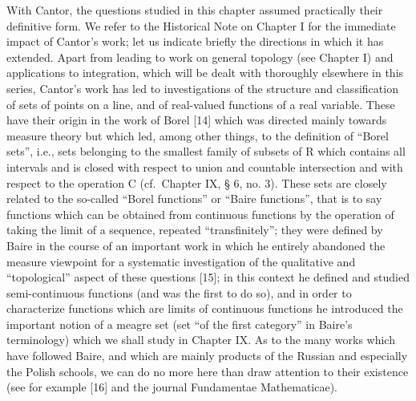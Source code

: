 With Cantor, the questions studied in this chapter assumed practically their definitive form. We refer to the Historical Note on Chapter I for the immediate impact of Cantor's work; let us indicate briefly the directions in which it has extended. Apart from leading to work on general topology (see Chapter I) and applications to integration, which will be dealt with thoroughly elsewhere in this series, Cantor's work has led to investigations of the structure and classification of sets of points on a line, and of real-valued functions of a real variable. These have their origin in the work of Borel {[}14{]} which was directed mainly towards measure theory but which led, among other things, to the definition of ``Borel sets'', i.e., sets belonging to the smallest family of subsets of R which contains all intervals and is closed with respect to union and countable intersection and with respect to the operation C (cf.~Chapter IX, § 6, no. 3). These sets are closely related to the so-called ``Borel functions'' or ``Baire functions'', that is to say functions which can be obtained from continuous functions by the operation of taking the limit of a sequence, repeated ``transfinitely''; they were defined by Baire in the course of an important work in which he entirely abandoned the measure viewpoint for a systematic investigation of the qualitative and ``topological'' aspect of these questions {[}15{]}; in this context he defined and studied semi-continuous functions (and was the first to do so), and in order to characterize functions which are limits of continuous functions he introduced the important notion of a meagre set (set ``of the first category'' in Baire's terminology) which we shall study in Chapter IX. As to the many works which have followed Baire, and which are mainly products of the Russian and especially the Polish schools, we can do no more here than draw attention to their existence (see for example {[}16{]} and the journal Fundamentae Mathematicae).

